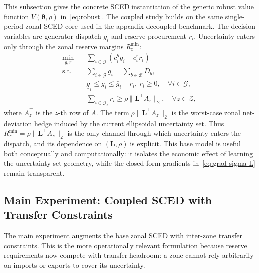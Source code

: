 \documentclass[11pt]{article}
\newcommand{\cG}{\mathcal{G}}
\newcommand{\cB}{\mathcal{B}}
\newcommand{\cZ}{\mathcal{Z}}
\newcommand{\btheta}{\bm{\theta}}
\newcommand{\bL}{\bm{L}}
\theoremstyle{definition}
\begin{document}
This subsection gives the concrete SCED instantiation of the generic robust value function $V(\btheta,\rho)$ in~\eqref{eq:robust}. The coupled study builds on the same single-period zonal SCED core used in the appendix decoupled benchmark. The decision variables are generator dispatch $g_i$ and reserve procurement $r_i$. Uncertainty enters only through the zonal reserve margins $R_z^{\min}$:
\begin{equation}\label{eq:decoupled-sced}
\begin{aligned}
\min_{g,r}\quad & \sum_{i \in \cG}(c_i^g g_i + c_i^r r_i) \\
\text{s.t.}\quad
& \sum_{i\in\cG} g_i = \sum_{b\in\cB} D_b, \\
& \underline g_i \le g_i \le \bar g_i - r_i,\ r_i\ge 0, \quad \forall i\in\cG,\\
& \sum_{i \in \cG_z} r_i \ge \rho\|\bL^\top A_z\|_2, \quad \forall z\in\cZ,
\end{aligned}
\end{equation}
where $A_z^\top$ is the $z$-th row of $A$. The term $\rho\|\bL^\top A_z\|_2$ is the worst-case zonal net-deviation hedge induced by the current ellipsoidal uncertainty set. Thus $R_z^{\min} = \rho\|\bL^\top A_z\|_2$ is the only channel through which uncertainty enters the dispatch, and its dependence on $(\bL,\rho)$ is explicit. This base model is useful both conceptually and computationally: it isolates the economic effect of learning the uncertainty-set geometry, while the closed-form gradients in~\eqref{eq:grad-sigma-L} remain transparent.

\subsection{Main Experiment: Coupled SCED with Transfer Constraints}

The main experiment augments the base zonal SCED with inter-zone transfer constraints. This is the more operationally relevant formulation because reserve requirements now compete with transfer headroom: a zone cannot rely arbitrarily on imports or exports to cover its uncertainty.
\end{document}
